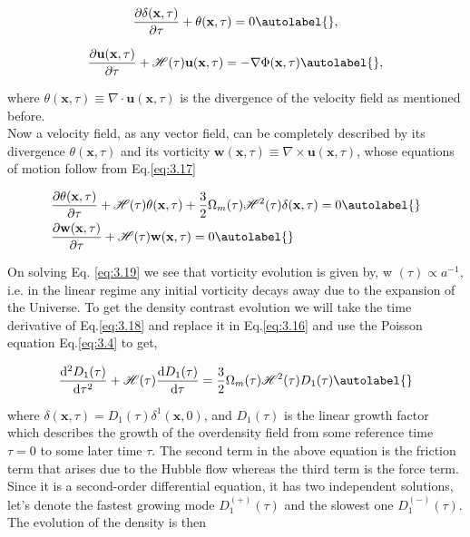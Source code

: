 \begin{equation}
    \frac{\partial \delta(\mathbf{x}, \tau)}{\partial \tau}+\theta(\mathbf{x}, \tau)=0 \autolabel{},
\end{equation}



\begin{equation}
    \frac{\partial \mathbf{u}(\mathbf{x}, \tau)}{\partial \tau}+\mathcal{H}(\tau) \mathbf{u}(\mathbf{x}, \tau)=-\nabla \Phi(\mathbf{x}, \tau) \autolabel{},
\end{equation}


where $\theta(\mathbf{x}, \tau) \equiv \nabla \cdot \mathbf{u}(\mathbf{x}, \tau)$ is the divergence of the velocity field as mentioned before. \\
Now a velocity field, as any vector field, can be completely described by its divergence $\theta(\mathbf{x}, \tau)$ and its vorticity $\mathbf{w}(\mathbf{x}, \tau) \equiv \nabla \times \mathbf{u}(\mathbf{x}, \tau)$, whose equations of motion follow from Eq.\eqref{eq:3.17}


\begin{align*}
    & \frac{\partial \theta(\mathbf{x}, \tau)}{\partial \tau}+\mathcal{H}(\tau) \theta(\mathbf{x}, \tau)+\frac{3}{2} \Omega_{m}(\tau) \mathcal{H}^{2}(\tau) \delta(\mathbf{x}, \tau)=0  \autolabel{}\\
    & \frac{\partial \mathbf{w}(\mathbf{x}, \tau)}{\partial \tau}+\mathcal{H}(\tau) \mathbf{w}(\mathbf{x}, \tau)=0 \autolabel{}
\end{align*}


On solving Eq. \eqref{eq:3.19} we see that vorticity evolution is given by, w $(\tau) \propto a^{-1}$, i.e. in the linear regime any initial vorticity decays away due to the expansion of the Universe. To get the density contrast evolution we will take the time derivative of Eq.\eqref{eq:3.18} and replace it in Eq.\eqref{eq:3.16} and use the Poisson equation Eq.\eqref{eq:3.4} to get,


\begin{equation}
    \frac{\mathrm{d}^{2} D_{1}(\tau)}{\mathrm{d} \tau^{2}}+\mathcal{H}(\tau) \frac{\mathrm{d} D_{1}(\tau)}{\mathrm{d} \tau}=\frac{3}{2} \Omega_{m}(\tau) \mathcal{H}^{2}(\tau) D_{1}(\tau) \autolabel{}
\end{equation}


where $\delta(\mathbf{x}, \tau)=D_{1}(\tau) \delta^{1}(\mathbf{x}, 0)$, and $D_{1}(\tau)$ is the linear growth factor which describes the growth of the overdensity field from some reference time $\tau = 0$ to some later time $\tau$. The second term in the above equation is the friction term that arises due to the Hubble flow whereas the third term is the force term. Since it is a second-order differential equation, it has two independent solutions, let's denote the fastest growing mode $D_{1}^{(+)}(\tau)$ and the slowest one $D_{1}^{(-)}(\tau)$. The evolution of the density is then


